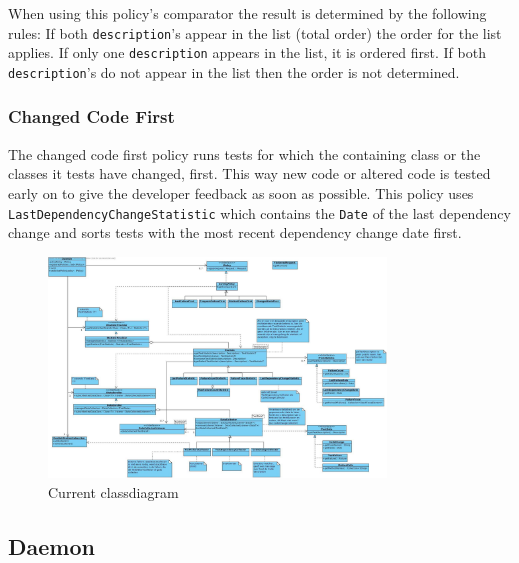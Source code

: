 \documentclass[i2]{oss}
\newcommand{\class}[1]{\texttt{#1}}
\begin{document}
When using this policy's comparator the result is determined by the 
following rules:
If both \class{description}'s appear in the list (total order) the order 
for the list applies.
If only one \class{description} appears in the list, it is ordered first.
If both \class{description}'s do not appear in the list then the order 
is not determined.

\subsubsection{Changed Code First}

The changed code first policy runs tests for which the containing class 
or the classes it tests have changed, first.
This way new code or altered code is tested early on to give the 
developer feedback as soon as possible.
This policy uses \class{LastDependencyChangeStatistic} which contains the
\class{Date} of the last dependency change and sorts tests with the most 
recent dependency change date first.


\begin{figure}[tbp]
\begin{center}
    \includegraphics[width=0.8\textwidth]{klassendiagram3}
    \caption{Current classdiagram}
	\label{fig:kd-h}
\end{center}
\end{figure}




\subsection{Daemon}
\label{subssec: daemon}
\end{document}
